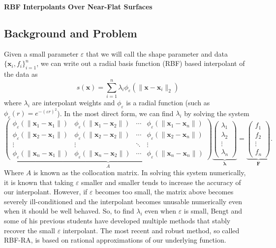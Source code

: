 \documentclass[a4paper,11pt]{article}
\newcommand{\eps}{\varepsilon}
\newcommand{\norm}[1]{\lVert #1 \rVert}
\newcommand{\pmat}[1]{\begin{pmatrix} #1 \end{pmatrix}}
\begin{document}
\begin{center}
	{\Large\textbf{RBF Interpolants Over Near-Flat Surfaces}}
\end{center}

\subsection*{Background and Problem}
Given a small parameter $ \eps $ that we will call the shape parameter and data $ \{\mathbf{x}_i, f_i\}_{i = 1}^n $, we can write out a radial basis function (RBF) based interpolant of the data as
\begin{equation}
	s(\mathbf{x}) = \sum_{i = 1}^n \lambda_i \phi_\eps(\norm{\mathbf{x} - \mathbf{x}_i}_2) \label{func:interp}
\end{equation}
where $ \lambda_i $ are interpolant weights and $ \phi_\eps $ is a radial function (such as $ \phi_\eps(r) = e^{-(\eps r)^2} $). In the most direct form, we can find $ \lambda_i $ by solving the system
\begin{equation}
	\underbrace{\pmat{
		\phi_\eps (\norm{\mathbf{x}_1 - \mathbf{x}_1}) & \phi_\eps (\norm{\mathbf{x}_1 - \mathbf{x}_2}) & \cdots & \phi_\eps (\norm{\mathbf{x}_1 - \mathbf{x}_n}) \\
		\phi_\eps (\norm{\mathbf{x}_2 - \mathbf{x}_1}) & \phi_\eps (\norm{\mathbf{x}_2 - \mathbf{x}_2}) & \cdots & \phi_\eps (\norm{\mathbf{x}_2 - \mathbf{x}_n}) \\
		\vdots & \vdots & \ddots & \vdots \\
		\phi_\eps (\norm{\mathbf{x}_n - \mathbf{x}_1}) & \phi_\eps (\norm{\mathbf{x}_n - \mathbf{x}_2}) & \cdots & \phi_\eps (\norm{\mathbf{x}_n - \mathbf{x}_n})
	}}_{A} \underbrace{\pmat{
		\lambda_1 \\ \lambda_2 \\ \vdots \\ \lambda_n
	}}_{\pmb{\lambda}} = \underbrace{\pmat{
		f_1 \\ f_2 \\ \vdots \\ f_n
	}}_{\pmb{F}}. \label{equ:direct}
\end{equation}
Where $ A $ is known as the collocation matrix. In solving this system numerically, it is known that taking $ \eps $ smaller and smaller tends to increase the accuracy of our interpolant. However, if $ \eps $ becomes too small, the matrix above becomes severely ill-conditioned and the interpolant becomes unusable numerically even when it should be well behaved. So, to find $ \lambda_i $ even when $ \eps $ is small, Bengt and some of his previous students have developed multiple methods that stably recover the small $ \eps $ interpolant. The most recent and robust method, so called RBF-RA, is based on rational approximations of our underlying function. 
\end{document}

